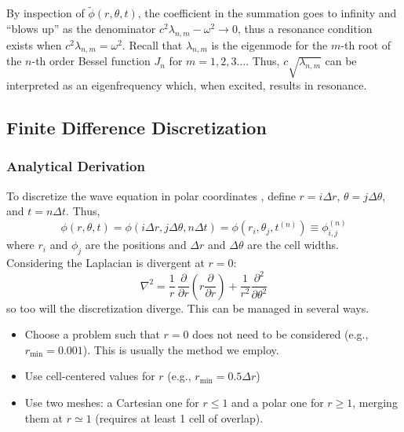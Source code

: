 \documentclass{homework}
\begin{document}
\noindent By inspection of $\tilde{\phi}(r, \theta, t)$, the coefficient in the summation goes to infinity and ``blows up'' as the denominator $c^2 \lambda_{n,m} - \omega^2 \rightarrow 0$, thus a resonance condition exists when $c^2 \lambda_{n,m} = \omega^2$. Recall that $\lambda_{n,m}$ is the eigenmode for the $m$-th root of the $n$-th order Bessel function $J_n$ for $m = 1,2,3 \dots$. Thus, $c \sqrt{\lambda_{n,m}}$ can be interpreted as an eigenfrequency which, when excited, results in resonance.
\newpage
\subsection{Finite Difference Discretization}

\subsubsection{\textbf{Analytical Derivation}}
To discretize the wave equation in polar coordinates \cite{StackEx}, define $r = i \Delta r$, $\theta = j \Delta \theta$, and $t = n \Delta t$. Thus,
$$ \phi \left(r, \theta, t \right)= \phi \left(i \Delta r, j \Delta \theta, n \Delta t \right) = \phi \left(r_i, \theta_j, t^{\left(n\right)} \right) \equiv \phi_{i,j}^{\left(n\right)} $$
where $r_i$ and $\phi_j$ are the positions and $\Delta r$ and $\Delta \theta$ are the cell widths.
\\[5pt] \noindent
Considering the Laplacian is divergent at $r=0$:
$$ \nabla^2 = \frac{1}{r} \, \frac{\partial}{\partial r} \left(r \frac{\partial}{\partial r}\right)+ \frac{1}{r^2} \frac{\partial^2}{\partial \theta^2} $$
so too will the discretization diverge. This can be managed in several ways.
\begin{itemize}
    \item Choose a problem such that $r=0$ does not need to be considered (e.g., $r_{\textrm{min}} = 0.001$). This is usually the method we employ. 
    \item Use cell-centered values for $r$ (e.g., $r_{\textrm{min}} = 0.5 \Delta r$)
    \item Use two meshes: a Cartesian one for $r  \leq 1$ and a polar one for $r \geq 1$, merging them at $r \simeq 1 $ (requires at least 1 cell of overlap).
\end{itemize}
\end{document}
